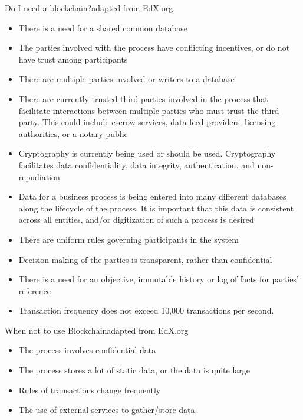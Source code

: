 \documentclass[pdf,table]{beamer}
\begin{document}
\begin{frame}{Do I need a blockchain?}{adapted from EdX.org}
	\begin{itemize} %
           \item There is a need for a shared common database
           \item The parties involved with the process have conflicting incentives, or do not have trust among participants
           \item There are multiple parties involved or writers to a database
           \item There are currently trusted third parties involved in the process that facilitate interactions between multiple parties who must trust the third party. This could include escrow services, data feed providers, licensing authorities, or a notary public
           \item Cryptography is currently being used or should be used. Cryptography facilitates data confidentiality, data integrity, authentication, and non-repudiation
           \item Data for a business process is being entered into many different databases along the lifecycle of the process. It is important that this data is consistent across all entities, and/or digitization of such a process is desired
           \item There are uniform rules governing participants in the system
           \item Decision making of the parties is transparent, rather than confidential
           \item There is a need for an objective, immutable history or log of facts for parties’ reference
           \item Transaction frequency does not exceed 10,000 transactions per second.
	\end{itemize}
\end{frame}



\begin{frame}{When not to use Blockchain}{adapted from EdX.org}
	\begin{itemize}
           \item The process involves confidential data
           \item The process stores a lot of static data, or the data is quite large
           \item Rules of transactions change frequently
           \item The use of external services to gather/store data.
	\end{itemize}
\end{frame}
\end{document}
